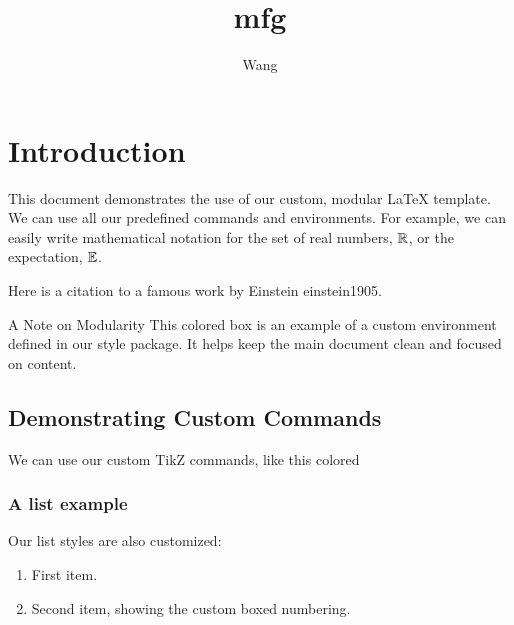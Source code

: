 \documentclass{e_class_noteLong}
\begin{document}
\author{Wang}
\title{mfg}

\maketitle
\mytoc

\chapter{Introduction}

This document demonstrates the use of our custom, modular \LaTeX{} template. 
We can use all our predefined commands and environments. For example, we can easily write mathematical notation for the set of real numbers, $\mathbb{R}$, or the expectation, $\mathbb{E}$.

Here is a citation to a famous work by Einstein einstein1905.

\begin{special_columns}{A Note on Modularity}
    This colored box is an example of a custom environment defined in our style package. It helps keep the main document clean and focused on content.
\end{special_columns}

\section{Demonstrating Custom Commands}

We can use our custom TikZ commands, like this colored 

\subsection{A list example}
Our list styles are also customized:
\begin{enumerate}
    \item First item.
    \item Second item, showing the custom boxed numbering.
\end{enumerate}
\end{document}
